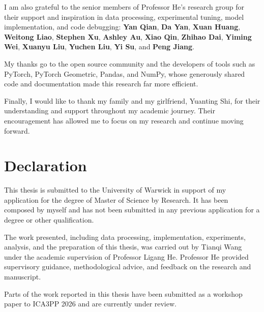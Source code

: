 \documentclass[12pt,a4paper]{report}
\begin{document}
	I am also grateful to the senior members of Professor He's research group for their support and inspiration in data processing, experimental tuning, model implementation, and code debugging: \textbf{Yan Qian}, \textbf{Da Yan}, \textbf{Xuan Huang}, \textbf{Weitong Liao}, \textbf{Stephen Xu}, \textbf{Ashley Au}, \textbf{Xiao Qin}, \textbf{Zhihao Dai}, \textbf{Yiming Wei}, \textbf{Xuanyu Liu}, \textbf{Yuchen Liu}, \textbf{Yi Su}, and \textbf{Peng Jiang}.
	
	My thanks go to the open source community and the developers of tools such as PyTorch, PyTorch Geometric, Pandas, and NumPy, whose generously shared code and documentation made this research far more efficient.
	
	Finally, I would like to thank my family and my girlfriend, Yuanting Shi, for their understanding and support throughout my academic journey. Their encouragement has allowed me to focus on my research and continue moving forward.
	
	\clearpage
	\chapter*{Declaration}
	This thesis is submitted to the University of Warwick in support of my application for the degree of Master of Science by Research. It has been composed by myself and has not been submitted in any previous application for a degree or other qualification.

	The work presented, including data processing, implementation, experiments, analysis, and the preparation of this thesis, was carried out by Tianqi Wang under the academic supervision of Professor Ligang He. Professor He provided supervisory guidance, methodological advice, and feedback on the research and manuscript.

	Parts of the work reported in this thesis have been submitted as a workshop paper to ICA3PP 2026 and are currently under review.

	\clearpage
\end{document}
